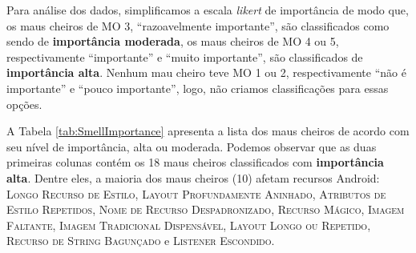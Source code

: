 Para análise dos dados, simplificamos a escala \textit{likert} de importância de modo que, os maus cheiros de MO 3, ``razoavelmente importante'', são classificados como sendo de \textbf{\small importância moderada}, os maus cheiros de MO 4 ou 5, respectivamente ``importante'' e ``muito importante'', são classificados de \textbf{\small importância alta}. Nenhum mau cheiro teve MO 1 ou 2, respectivamente ``não é importante'' e ``pouco importante'', logo, não criamos classificações para essas opções. 

A Tabela \ref{tab:SmellImportance} apresenta a lista dos maus cheiros de acordo com seu nível de importância, alta ou moderada. Podemos observar que as duas primeiras colunas contém os 18 maus cheiros classificados com \textbf{\small importância alta}. Dentre eles, a maioria dos maus cheiros (10) afetam recursos Android: \textsc{\small Longo Recurso de Estilo}, \textsc{\small Layout Profundamente Aninhado}, \textsc{\small Atributos de Estilo Repetidos}, \textsc{\small Nome de Recurso Despadronizado}, \textsc{\small Recurso Mágico}, \textsc{\small Imagem Faltante}, \textsc{\small Imagem Tradicional Dispensável}, \textsc{\small Layout Longo ou Repetido}, \textsc{\small Recurso de String Bagunçado} e \textsc{\small Listener Escondido}.

